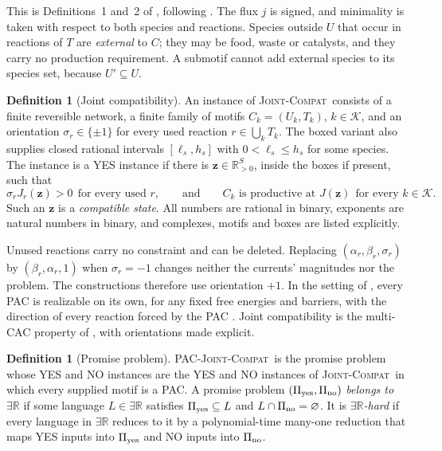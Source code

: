 \documentclass[11pt,a4paper]{article}
\theoremstyle{plain}
\theoremstyle{definition}
\newtheorem{definition}[theorem]{Definition}
\theoremstyle{remark}
\newcommand{\ER}{\exists\mathbb{R}}
\newcommand{\R}{\mathbb{R}}
\newcommand{\act}{\boldsymbol z}
\newcommand{\JC}{\textup{\textsc{Joint-Compat}}}
\newcommand{\PJC}{\textup{\textsc{PAC-Joint-Compat}}}
\begin{document}
This is Definitions~1 and~2 of \citep{kosc2025}, following \citep{blokhuis2020}. The flux $j$ is signed, and minimality is taken with respect to both species and reactions. Species outside $U$ that occur in reactions of $T$ are \emph{external} to $C$; they may be food, waste or catalysts, and they carry no production requirement. A submotif cannot add external species to its species set, because $U'\subseteq U$.

\begin{definition}[Joint compatibility]\label{def:jc}
An instance of \JC\ consists of a finite reversible network, a finite family of motifs $C_k=(U_k,T_k)$, $k\in\mathcal K$, and an orientation $\sigma_r\in\{\pm1\}$ for every used reaction $r\in\bigcup_kT_k$. The boxed variant also supplies closed rational intervals $[\ell_s,h_s]$ with $0<\ell_s\le h_s$ for some species. The instance is a YES instance if there is $\act\in\R_{>0}^S$, inside the boxes if present, such that
\[
 \sigma_rJ_r(\act)>0\ \ \text{for every used }r,\qquad\text{and}\qquad C_k\text{ is productive at }J(\act)\ \ \text{for every }k\in\mathcal K.
\]
Such an $\act$ is a \emph{compatible state}. All numbers are rational in binary, exponents are natural numbers in binary, and complexes, motifs and boxes are listed explicitly.
\end{definition}

Unused reactions carry no constraint and can be deleted. Replacing $(\alpha_r,\beta_r,\sigma_r)$ by $(\beta_r,\alpha_r,1)$ when $\sigma_r=-1$ changes neither the currents' magnitudes nor the problem. The constructions therefore use orientation $+1$. In the setting of \citep{kosc2025}, every PAC is realizable on its own, for any fixed free energies and barriers, with the direction of every reaction forced by the PAC \citep[Theorem~2 and Corollary~1]{kosc2025}. Joint compatibility is the multi-CAC property of \citep{kosc2025}, with orientations made explicit.

\begin{definition}[Promise problem]\label{def:promise}
\PJC\ is the promise problem whose YES and NO instances are the YES and NO instances of \JC\ in which every supplied motif is a PAC. A promise problem $(\Pi_{\rm yes},\Pi_{\rm no})$ \emph{belongs to} $\ER$ if some language $L\in\ER$ satisfies $\Pi_{\rm yes}\subseteq L$ and $L\cap\Pi_{\rm no}=\varnothing$. It is \emph{$\ER$-hard} if every language in $\ER$ reduces to it by a polynomial-time many-one reduction that maps YES inputs into $\Pi_{\rm yes}$ and NO inputs into $\Pi_{\rm no}$.
\end{definition}
\end{document}

